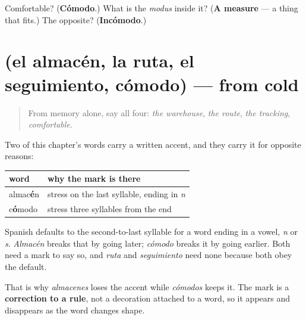 \begin{tcolorbox}[breakable,colback=teal!4,colframe=teal!35!black,title={Before you move on}]
Comfortable? (\textbf{Cómodo}.) What is the \emph{modus} inside it? (\textbf{A measure} — a thing that fits.) The opposite? (\textbf{Incómodo}.)
\end{tcolorbox}
\section[(el almacén, la ruta, el seguimiento …]{(el almacén, la ruta, el seguimiento, cómodo) — from cold}

\label{lesson:ES-R452-repaso-reparto}



\begin{quote}
From memory alone, say all four: \emph{the warehouse}, \emph{the route}, \emph{the tracking}, \emph{comfortable}.
\end{quote}

\begin{grammarlens}[title={Grammar Lens: three accents, three different jobs}]
Two of this chapter's words carry a written accent, and they carry it for opposite reasons:

\noindent
\begin{tabularx}{\linewidth}{@{}>{\raggedright\arraybackslash}X>{\raggedright\arraybackslash}X@{}}
\toprule
\textbf{word} & \textbf{why the mark is there} \\
\midrule
almac\textbf{é}n & stress on the last syllable, ending in \emph{n} \\
c\textbf{ó}modo & stress three syllables from the end \\
\bottomrule
\end{tabularx}

Spanish defaults to the second-to-last syllable for a word ending in a vowel, \emph{n} or \emph{s}. \emph{Almacén} breaks that by going later; \emph{cómodo} breaks it by going earlier. Both need a mark to say so, and \emph{ruta} and \emph{seguimiento} need none because both obey the default.

That is why \emph{almacenes} loses the accent while \emph{cómodos} keeps it. The mark is a \textbf{correction to a rule}, not a decoration attached to a word, so it appears and disappears as the word changes shape.
\end{grammarlens}

